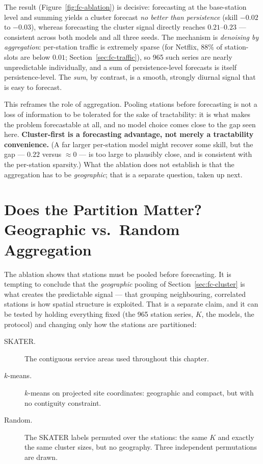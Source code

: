 The result (Figure~\ref{fig:fc-ablation}) is decisive: forecasting at the base-station level and summing
yields a cluster forecast \emph{no better than persistence} (skill $-0.02$ to $-0.03$), whereas forecasting
the cluster signal directly reaches $0.21$--$0.23$ --- consistent across both models and all three seeds.
The mechanism is \emph{denoising by aggregation}: per-station traffic is extremely sparse (for Netflix,
$88\%$ of station-slots are below $0.01$; Section~\ref{sec:fc-traffic}), so 965 such series are nearly unpredictable individually,
and a sum of persistence-level forecasts is itself persistence-level. The \emph{sum}, by contrast, is a
smooth, strongly diurnal signal that is easy to forecast.

This reframes the role of aggregation. Pooling stations before forecasting is not a loss of information
to be tolerated for the sake of tractability: it is what makes the problem forecastable at all, and no
model choice comes close to the gap seen here. \textbf{Cluster-first is a forecasting advantage, not
merely a tractability convenience.} (A far larger per-station model might recover some skill, but the
gap --- $0.22$ versus $\approx 0$ --- is too large to plausibly close, and is consistent with the
per-station sparsity.) What the ablation does not establish is that the aggregation has to be
\emph{geographic}; that is a separate question, taken up next.

\section{Does the Partition Matter? Geographic vs.\ Random Aggregation}
\label{sec:partition}

The ablation shows that stations must be pooled before forecasting. It is tempting to conclude that
the \emph{geographic} pooling of Section~\ref{sec:fc-cluster} is what creates the predictable signal ---
that grouping neighbouring, correlated stations is how spatial structure is exploited. That is a
separate claim, and it can be tested by holding everything fixed (the 965 station series, $K$, the
models, the protocol) and changing only how the stations are partitioned:

\begin{description}
  \item[SKATER.] The contiguous service areas used throughout this chapter.
  \item[$k$-means.] $k$-means on projected site coordinates: geographic and compact, but with no
  contiguity constraint.
  \item[Random.] The SKATER labels permuted over the stations: the same $K$ and exactly the same
  cluster sizes, but no geography. Three independent permutations are drawn.
\end{description}

